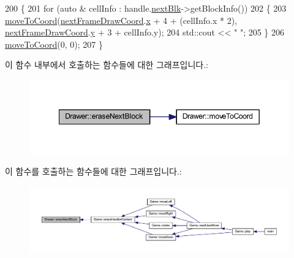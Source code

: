 \begin{DoxyCode}
200     \{
201         \textcolor{keywordflow}{for} (\textcolor{keyword}{auto} & cellInfo : handle.\mbox{\hyperlink{class_block_handler_a7a7f96fa7c0d44f9e0fb5e52ebc9c428}{nextBlk}}->getBlockInfo())
202         \{
203             \mbox{\hyperlink{class_drawer_ac1a96e007c07cab2e36a7c78484ee9a6}{moveToCoord}}(\mbox{\hyperlink{tetris__drawer_8h_a83cc61593b9fb64d690139400b3d760b}{nextFrameDrawCoord}}.\mbox{\hyperlink{struct_coord_a696eaa744360fc791d0e3b331c549dbe}{x}} + 4 + (cellInfo.x * 2), 
      \mbox{\hyperlink{tetris__drawer_8h_a83cc61593b9fb64d690139400b3d760b}{nextFrameDrawCoord}}.\mbox{\hyperlink{struct_coord_a214166cca70cef7dda9201689c3e81ab}{y}} + 3 + cellInfo.y);
204             std::cout << \textcolor{stringliteral}{"  "};
205         \}
206         \mbox{\hyperlink{class_drawer_ac1a96e007c07cab2e36a7c78484ee9a6}{moveToCoord}}(0, 0);
207     \}
\end{DoxyCode}
이 함수 내부에서 호출하는 함수들에 대한 그래프입니다.\+:
\nopagebreak
\begin{figure}[H]
\begin{center}
\leavevmode
\includegraphics[width=349pt]{class_drawer_a3110e80f9256176373f0580788e69037_cgraph}
\end{center}
\end{figure}
이 함수를 호출하는 함수들에 대한 그래프입니다.\+:
\nopagebreak
\begin{figure}[H]
\begin{center}
\leavevmode
\includegraphics[width=350pt]{class_drawer_a3110e80f9256176373f0580788e69037_icgraph}
\end{center}
\end{figure}
\mbox{\label{class_drawer_ac1a96e007c07cab2e36a7c78484ee9a6}} 
